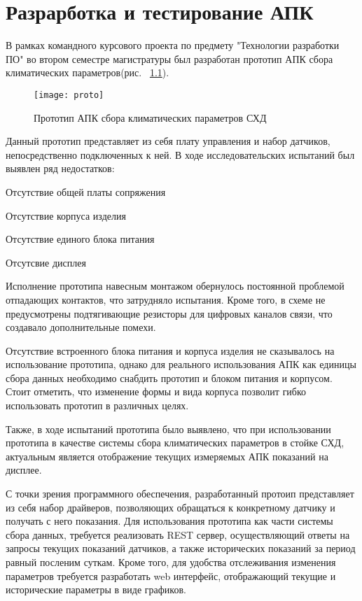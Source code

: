 
\chapter{Разрарботка и тестирование АПК}

В рамках командного курсового проекта по предмету "Технологии разработки ПО" во втором семестре магистратуры был разработан прототип АПК сбора климатических параметров(рис. ~\ref{fig:proto}).

\begin{figure}[H]
	\centering
	\texttt{[image: proto]}
	\caption{Прототип АПК сбора климатических параметров СХД}
	\label{fig:proto}
\end{figure}
Данный прототип представляет из себя плату управления и набор датчиков, непосредственно подключенных к ней. В ходе исследовательских испытаний был выявлен ряд недостатков: 
\begin{itemize*}
	\item{Отсутствие общей платы сопряжения}
	\item{Отсутствие корпуса изделия}
	\item{Отсутствие единого блока питания}
	\item{Отсутсвие дисплея}
\end{itemize*}

Исполнение прототипа навесным монтажом обернулось постоянной проблемой отпадающих контактов, что затрудняло испытания. Кроме того, в схеме не предусмотрены подтягивающие резисторы для цифровых каналов связи, что создавало дополнительные помехи. 

Отсутствие встроенного блока питания и корпуса изделия не сказывалось на использование прототипа, однако для реального использования АПК как единицы сбора данных необходимо снабдить прототип и блоком питания и корпусом. Стоит отметить, что изменение формы и вида корпуса позволит гибко использовать прототип в различных целях.

Также, в ходе испытаний прототипа было выявлено, что при использовании прототипа в качестве системы сбора климатических параметров в стойке СХД, актуальным является отображение текущих измеряемых АПК показаний на дисплее. 

С точки зрения программного обеспечения, разработанный протоип представляет из себя набор драйверов, позволяющих обращаться к конкретному датчику и получать с него показания. Для использования прототипа как части системы сбора данных, требуется реализовать REST сервер, осуществляющий ответы на запросы текущих показаний датчиков, а также исторических показаний за период равный посленим суткам. Кроме того, для удобства отслеживания изменения параметров требуется разработать web интерфейс, отображающий текущие и исторические параметры в виде графиков.

